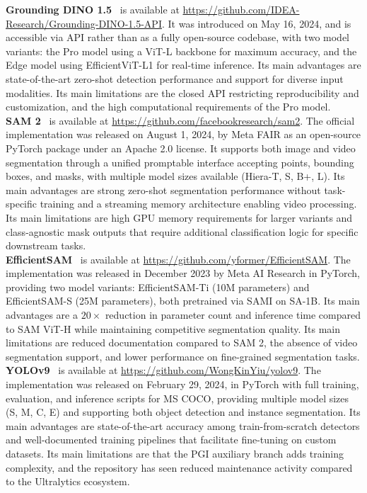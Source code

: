 \documentclass[11pt]{article}
\begin{document}
\textbf{Grounding DINO 1.5}~\cite{RenGroundingDINO15} is available at 
\url{https://github.com/IDEA-Research/Grounding-DINO-1.5-API}. It was introduced 
on May 16, 2024, and is accessible via API rather than as a fully open-source 
codebase, with two model variants: the Pro model using a ViT-L backbone for maximum 
accuracy, and the Edge model using EfficientViT-L1 for real-time inference. Its main 
advantages are state-of-the-art zero-shot detection performance and support for 
diverse input modalities. Its main limitations are the closed API restricting 
reproducibility and customization, and the high computational requirements of the 
Pro model.\\

\textbf{SAM 2}~\cite{Ravi2024SAM2} is available at 
\url{https://github.com/facebookresearch/sam2}. The official implementation was 
released on August 1, 2024, by Meta FAIR as an open-source PyTorch package under 
an Apache 2.0 license. It supports both image and video segmentation through a 
unified promptable interface accepting points, bounding boxes, and masks, with 
multiple model sizes available (Hiera-T, S, B+, L). Its main advantages are strong 
zero-shot segmentation performance without task-specific training and a streaming 
memory architecture enabling video processing. Its main limitations are high GPU 
memory requirements for larger variants and class-agnostic mask outputs that require 
additional classification logic for specific downstream tasks.\\

\textbf{EfficientSAM}~\cite{Xiong2023EfficientSAM} is available at 
\url{https://github.com/yformer/EfficientSAM}. The implementation was released in 
December 2023 by Meta AI Research in PyTorch, providing two model variants: 
EfficientSAM-Ti (10M parameters) and EfficientSAM-S (25M parameters), both 
pretrained via SAMI on SA-1B. Its main advantages are a $20\times$ reduction in 
parameter count and inference time compared to SAM ViT-H while maintaining 
competitive segmentation quality. Its main limitations are reduced documentation 
compared to SAM 2, the absence of video segmentation support, and lower performance 
on fine-grained segmentation tasks.\\

\textbf{YOLOv9}~\cite{Wang2024YOLOv9} is available at 
\url{https://github.com/WongKinYiu/yolov9}. The implementation was released on 
February 29, 2024, in PyTorch with full training, evaluation, and inference scripts 
for MS COCO, providing multiple model sizes (S, M, C, E) and supporting both object 
detection and instance segmentation. Its main advantages are state-of-the-art 
accuracy among train-from-scratch detectors and well-documented training pipelines 
that facilitate fine-tuning on custom datasets. Its main limitations are that the 
PGI auxiliary branch adds training complexity, and the repository has seen reduced 
maintenance activity compared to the Ultralytics ecosystem.\\
\end{document}
